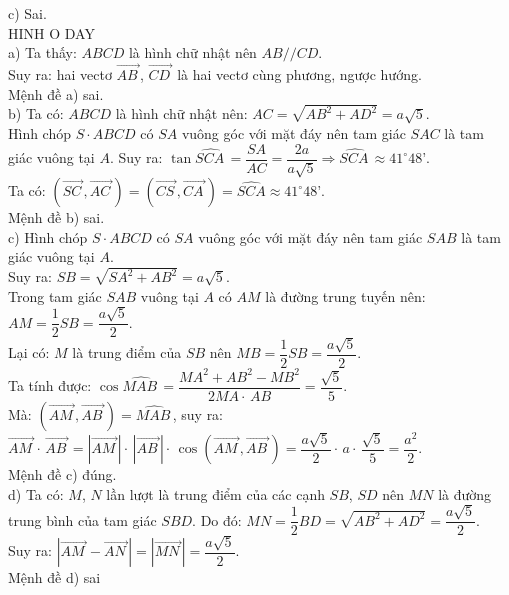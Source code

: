 \begin{ex}
{c) Sai.\\
{\centering\color{red} HINH O DAY}\\
a) Ta thấy: $ABCD$ là hình chữ nhật nên $AB//CD$.\\
Suy ra: hai vectơ $\vec{AB\,}$, $\vec{CD\,}$ là hai vectơ cùng phương, ngược hướng.\\
Mệnh đề a) sai.\\
b) Ta có: $ABCD$ là hình chữ nhật nên: $AC=\sqrt{AB^2+AD^2}=a\sqrt{5}$.\\
Hình chóp $S \cdot ABCD$ có $SA$ vuông góc với mặt đáy nên tam giác $SAC$ là tam giác vuông tại $A$. Suy ra: $\tan \widehat{SCA\,}=\dfrac{SA}{AC}=\dfrac{2a}{a\sqrt{5}}\Rightarrow \widehat{SCA\,}\approx 41^\circ 48’ $.\\
Ta có: $\left(\vec{SC\,},\vec{AC\,}\right)=\left(\vec{CS\,},\vec{CA\,}\right)=\widehat{SCA}\approx 41^\circ 48’ $.\\
Mệnh đề b) sai.\\
c) Hình chóp $S \cdot ABCD$ có $SA$ vuông góc với mặt đáy nên tam giác $SAB$ là tam giác vuông tại $A$.\\
Suy ra: $SB=\sqrt{SA^2+AB^2}=a\sqrt{5}$.\\
Trong tam giác $SAB$ vuông tại $A$ có $AM$ là đường trung tuyến nên: \\
$AM=\dfrac{1}{2}SB=\dfrac{a\sqrt{5}}{2}$.\\
Lại có: $M$ là trung điểm của $SB$ nên $MB=\dfrac{1}{2}SB=\dfrac{a\sqrt{5}}{2}$. \\
Ta tính được: $\cos \widehat{MAB\,}=\dfrac{MA^2+AB^2-MB^2}{2MA \cdot \,AB}=\dfrac{\sqrt{5}}{5}$.\\
Mà: $\left(\vec{AM\,},\vec{AB\,}\right)=\widehat{MAB\,}$, suy ra: \\
$\vec{AM\,}\cdot \,\vec{AB\,}=\left| \vec{AM\,} \right| \cdot \,\left| \vec{AB\,} \right| \cdot \,\cos \left(\vec{AM\,},\vec{AB\,}\right)=\dfrac{a\sqrt{5}}{2} \cdot \,a \cdot \,\dfrac{\sqrt{5}}{5}=\dfrac{a^2}{2}$.\\
Mệnh đề c) đúng.\\
d) Ta có: $M$, $N$ lần lượt là trung điểm của các cạnh $SB$, $SD$ nên $MN$ là đường trung bình của tam giác $SBD$. Do đó: $MN=\dfrac{1}{2}BD=\sqrt{AB^2+AD^2}=\dfrac{a\sqrt{5}}{2}$.\\
Suy ra: $\left| \vec{AM\,}-\vec{AN\,} \right|=\left| \vec{MN\,} \right|=\dfrac{a\sqrt{5}}{2}$. \\
Mệnh đề d) sai
}
\end{ex}
